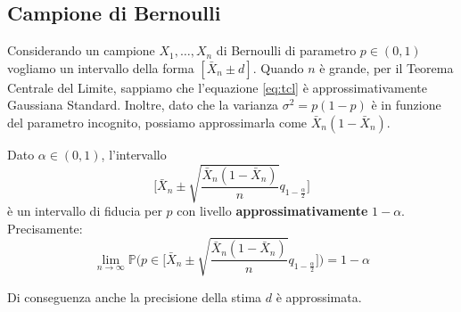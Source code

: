\subsection{Campione di Bernoulli}
Considerando un campione $X_1, \ldots, X_n$ di Bernoulli di parametro $p \in (0,1)$ vogliamo un intervallo della forma $[\bar{X}_n \pm d]$. Quando $n$ è grande, per il Teorema Centrale del Limite, sappiamo che l'equazione \ref{eq:tcl} è approssimativamente Gaussiana Standard. Inoltre, dato che la varianza $\sigma^2 = p(1-p)$ è in funzione del parametro incognito, possiamo approssimarla come $\bar{X}_n(1-\bar{X}_n)$.
\begin{definition}
	Dato $\alpha \in (0,1)$, l'intervallo
	\begin{equation}
		\bigg[\bar{X}_n \pm \sqrt{\frac{\bar{X}_n(1-\bar{X}_n)}{n}} q_{1-\frac{\alpha}{2}}\bigg]
	\end{equation}
	è un intervallo di fiducia per $p$ con livello \textbf{approssimativamente} $1-\alpha$. Precisamente:
	\begin{equation}
		\lim_{n \to \infty} \mathbb{P} \bigg(p \in \bigg[\bar{X}_n \pm \sqrt{\frac{\bar{X}_n(1-\bar{X}_n)}{n}} q_{1-\frac{\alpha}{2}}\bigg]\bigg) = 1-\alpha
	\end{equation}
\end{definition}

\begin{note}
	Di conseguenza anche la precisione della stima $d$ è approssimata.
\end{note}